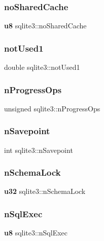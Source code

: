\mbox{\label{structsqlite3_a9db82963a50d1cebd34108a658cdb266}} 
\subsubsection{noSharedCache}
{\footnotesize\ttfamily \textbf{ u8} sqlite3\+::no\+Shared\+Cache}

\mbox{\label{structsqlite3_ae1df0284a2a490fad52480c4b8cf508b}} 
\subsubsection{notUsed1}
{\footnotesize\ttfamily double sqlite3\+::not\+Used1}

\mbox{\label{structsqlite3_aea053bf8f4c316fb2460a093e9ab32e7}} 
\subsubsection{nProgressOps}
{\footnotesize\ttfamily unsigned sqlite3\+::n\+Progress\+Ops}

\mbox{\label{structsqlite3_a51d1dc4f5668dbc2282162bdfdca96ec}} 
\subsubsection{nSavepoint}
{\footnotesize\ttfamily int sqlite3\+::n\+Savepoint}

\mbox{\label{structsqlite3_a57dddf2303cd94d5d2164417542ba751}} 
\subsubsection{nSchemaLock}
{\footnotesize\ttfamily \textbf{ u32} sqlite3\+::n\+Schema\+Lock}

\mbox{\label{structsqlite3_ade81cfca19daee0e1f9eb4bfcb73469c}} 
\subsubsection{nSqlExec}
{\footnotesize\ttfamily \textbf{ u8} sqlite3\+::n\+Sql\+Exec}

